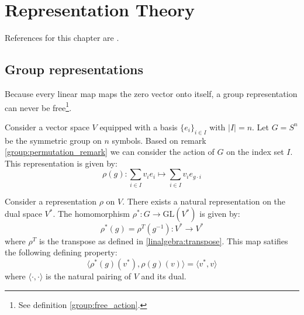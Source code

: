 \chapter{Representation Theory}

References for this chapter are \cite{fultonharris, jeevanjee}.

\section{Group representations}

        \begin{property}
            Because every linear map maps the zero vector onto itself, a group representation can never be free\footnote{See definition \ref{group:free_action}.}.
        \end{property}


    \begin{example}
        Consider a vector space $V$ equipped with a basis $\{e_i\}_{i\in I}$ with $|I| = n$. Let $G = S^n$ be the symmetric group on $n$ symbols. Based on remark \ref{group:permutation_remark} we can consider the action of $G$ on the index set $I$. This representation is given by:
        \begin{equation}
            \rho(g):\sum_{i\in I}v_ie_i\mapsto\sum_{i\in I}v_ie_{g\cdot i}
        \end{equation}
    \end{example}

        \begin{example}
            Consider a representation $\rho$ on $V$. There exists a natural representation on the dual space $V^*$. The homomorphism $\rho^*:G\rightarrow\text{GL}(V^*)$ is given by:
            \begin{equation}
                \rho^*(g) = \rho^T(g^{-1}): V^*\rightarrow V^*
            \end{equation}
            where $\rho^T$ is the transpose as defined in \ref{linalgebra:transpose}. This map satifies the following defining property:
            \begin{equation}
                \Big\langle\rho^*(g)(v^*), \rho(g)(v)\Big\rangle = \langle v^*, v\rangle
            \end{equation}
            where $\langle\cdot,\cdot\rangle$ is the natural pairing of $V$ and its dual.
        \end{example}

